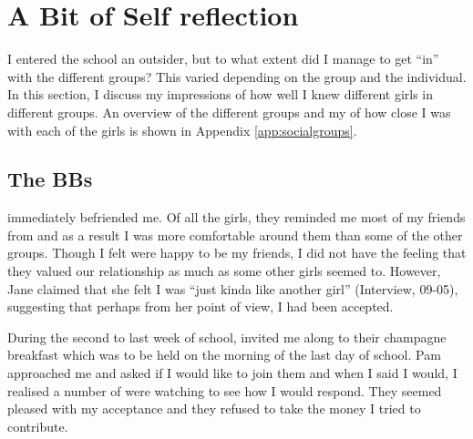   


\section{A Bit of Self reflection}

I entered the school an outsider, but to what extent did I manage to get ``in'' with the different groups?  This varied depending on the group and the individual. In this section, I discuss my impressions of how well I knew different girls in different groups. An overview of the different groups and my  of how close I was with each of the girls is shown in Appendix \ref{app:socialgroups}.

\subsection{The BBs}
 immediately befriended me. Of all the girls, they reminded me most of my friends from  and as a result I was more comfortable around them than some of the other groups. Though I felt  were happy to be my friends, I did not have the feeling that they valued our relationship as much as some other girls seemed to. However, Jane claimed that she felt I was ``just kinda like another girl'' (Interview, 09-05), suggesting that perhaps from her point of view, I had been accepted.

During the second to last week of school,  invited me along to their champagne breakfast which was to be held on the morning of the last day of school. Pam approached me and asked if I would like to join them and when I said I would, I realised a number of  were watching to see how I would respond. They seemed pleased with my acceptance and they refused to take the money I tried to contribute. 

